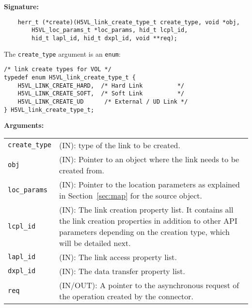\begin{mdframed}[style=bgbox]
\textbf{Signature:}
\begin{lstlisting}
    herr_t (*create)(H5VL_link_create_type_t create_type, void *obj,
        H5VL_loc_params_t *loc_params, hid_t lcpl_id, 
        hid_t lapl_id, hid_t dxpl_id, void **req);
\end{lstlisting}

The \texttt{create\_type} argument is an \texttt{enum}:
\begin{lstlisting}
/* link create types for VOL */
typedef enum H5VL_link_create_type_t {
    H5VL_LINK_CREATE_HARD,  /* Hard Link          */
    H5VL_LINK_CREATE_SOFT,  /* Soft Link          */
    H5VL_LINK_CREATE_UD      /* External / UD Link */
} H5VL_link_create_type_t;
\end{lstlisting}

\textbf{Arguments:}\\
\begin{tabular}{l p{13.5cm}}
  \texttt{create\_type} & (IN): type of the link to be created.\\
  \texttt{obj} & (IN): Pointer to an object where the link needs to be
  created from.\\
  \texttt{loc\_params} & (IN): Pointer to the location parameters as explained in
  Section~\ref{sec:map} for the source object. \\
  \texttt{lcpl\_id} & (IN): The link creation property list. It contains
  all the link creation properties in addition to other API parameters
  depending on the creation type, which will be detailed next.\\
  \texttt{lapl\_id} & (IN): The link access property list.\\
  \texttt{dxpl\_id} & (IN): The data transfer property list.\\
  \texttt{req} & (IN/OUT): A pointer to the asynchronous request of the
  operation created by the connector.\\
\end{tabular}
\end{mdframed}

